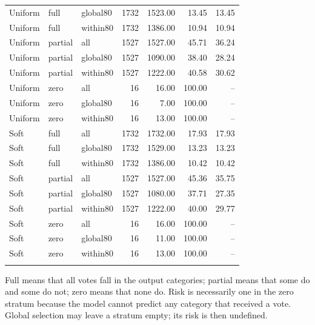 \documentclass[10pt]{article}
\begin{document}
\begin{longtable}{lllrrrr}
Uniform & full & global80 & 1732 & 1523.00 & 13.45 & 13.45\\
Uniform & full & within80 & 1732 & 1386.00 & 10.94 & 10.94\\
Uniform & partial & all & 1527 & 1527.00 & 45.71 & 36.24\\
Uniform & partial & global80 & 1527 & 1090.00 & 38.40 & 28.24\\
Uniform & partial & within80 & 1527 & 1222.00 & 40.58 & 30.62\\
Uniform & zero & all & 16 & 16.00 & 100.00 & --\\
Uniform & zero & global80 & 16 & 7.00 & 100.00 & --\\
Uniform & zero & within80 & 16 & 13.00 & 100.00 & --\\
\addlinespace
Soft & full & all & 1732 & 1732.00 & 17.93 & 17.93\\
Soft & full & global80 & 1732 & 1529.00 & 13.23 & 13.23\\
Soft & full & within80 & 1732 & 1386.00 & 10.42 & 10.42\\
Soft & partial & all & 1527 & 1527.00 & 45.36 & 35.75\\
Soft & partial & global80 & 1527 & 1080.00 & 37.71 & 27.35\\
Soft & partial & within80 & 1527 & 1222.00 & 40.00 & 29.77\\
Soft & zero & all & 16 & 16.00 & 100.00 & --\\
Soft & zero & global80 & 16 & 11.00 & 100.00 & --\\
Soft & zero & within80 & 16 & 13.00 & 100.00 & --\\
\addlinespace
\bottomrule\end{longtable}
Full means that all votes fall in the output categories; partial means that some do and some do not; zero means that none do. Risk is necessarily one in the zero stratum because the model cannot predict any category that received a vote. Global selection may leave a stratum empty; its risk is then undefined.
\end{document}
